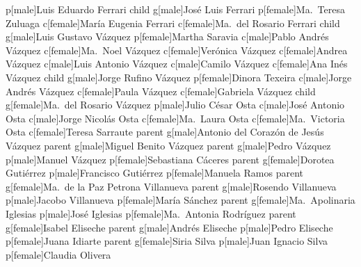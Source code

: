 \documentclass{standalone}
\begin{document}
\begin{genealogypicture}[template=signpost]
{{{            p[male]{Luis Eduardo Ferrari}
            child{%
                g[male]{José Luis Ferrari}
                p[female]{Ma.\ Teresa Zuluaga}
                c[female]{María Eugenia Ferrari}
            }
            c[female]{Ma.\ del Rosario Ferrari}
        }
        child{%
            g[male]{Luis Gustavo Vázquez}
            p[female]{Martha Saravia}
            c[male]{Pablo Andrés Vázquez}
            c[female]{Ma.\ Noel Vázquez}
            c[female]{Verónica Vázquez}
            c[female]{Andrea Vázquez}
            c[male]{Luis Antonio Vázquez}
            c[male]{Camilo Vázquez}
            c[female]{Ana Inés Vázquez}
        }
        child{%
            g[male]{Jorge Rufino Vázquez}
            p[female]{Dinora Texeira}
            c[male]{Jorge Andrés Vázquez}
            c[female]{Paula Vázquez}
            c[female]{Gabriela Vázquez}
        }
        child{%
            g[female]{Ma.\ del Rosario Vázquez}
            p[male]{Julio César Osta}
            c[male]{José Antonio Osta}
            c[male]{Jorge Nicolás Osta}
            c[female]{Ma.\ Laura Osta}
            c[female]{Ma.\ Victoria Osta}
            c[female]{Teresa Sarraute}
        }
    }
    parent{%
        g[male]{Antonio del Corazón de Jesús Vázquez}
        parent{%
            g[male]{Miguel Benito Vázquez}
            parent{%
                g[male]{Pedro Vázquez}
                p[male]{Manuel Vázquez}
                p[female]{Sebastiana Cáceres}
            }
            parent{%
                g[female]{Dorotea Gutiérrez}
                p[male]{Francisco Gutiérrez}
                p[female]{Manuela Ramos}
            }
        }
        parent{%
            g[female]{Ma.\ de la Paz Petrona Villanueva}
            parent{%
                g[male]{Rosendo Villanueva}
                p[male]{Jacobo Villanueva}
                p[female]{María Sánchez}
            }
            parent{%
                g[female]{Ma.\ Apolinaria Iglesias}
                p[male]{José Iglesias}
                p[female]{Ma.\ Antonia Rodríguez}
            }
        }
    }
    parent{%
        g[female]{Isabel Eliseche}
        parent{%
            g[male]{Andrés Eliseche}
            p[male]{Pedro Eliseche}
            p[female]{Juana Idiarte}
        }
        parent{%
            g[female]{Siria Silva}
            p[male]{Juan Ignacio Silva}
            p[female]{Claudia Olivera}
        }
    }
}

\end{genealogypicture}
\end{document}

